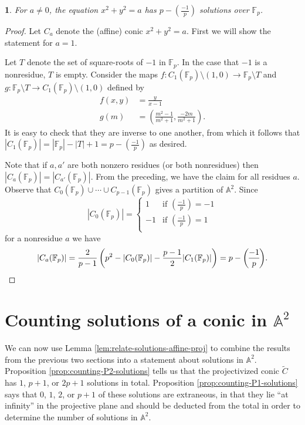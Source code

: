 \documentclass[10pt,a4paper]{amsart}
\numberwithin{equation}{section}
\numberwithin{figure}{section}
\numberwithin{table}{section}
\theoremstyle{definition}
\theoremstyle{plain}
\theoremstyle{remark}
\theoremstyle{plain}
\theoremstyle{definition}
\theoremstyle{plain}
\newtheorem{prop}[thm]{\protect\propositionname}
\theoremstyle{plain}
\providecommand{\propositionname}{Proposition}
\newcommand{\legendre}[2]{\genfrac{(}{)}{}{}{#1}{#2}}
\newcommand{\A}{\mathbb{A}}
\newcommand{\F}{\mathbb{F}}
\begin{document}
	\begin{prop}\label{prop:circle-solutions} 
		For $a \neq 0$, the equation $x^2 + y^2 = a$ has $p - \legendre{-1}{p}$ 
		solutions over $\F_p$.
	\end{prop} 
	\begin{proof} 
		Let $C_a$ denote the (affine) conic $x^2 + y^2 = a$. 
		First we will show the statement for $a=1$.
		
		Let $T$ denote the set of square-roots of $-1$ in $\F_p$. In the case
		that $-1$ is a nonresidue, $T$ is empty. Consider the maps $f\colon C_1(\F_p)
		\setminus (1,0) \to \F_p \setminus T$ and $g\colon \F_p
		\setminus T \to C_1(\F_p) \setminus (1,0)$ defined by 
		\begin{align*} 
		f(x,y) &= \frac{y}{x-1} \\ 
		g(m) &= \left(\frac{m^2 - 1}{m^2 + 1}, \frac{-2m}{m^2 + 1}\right).
		\end{align*} 
		It is easy to check that they are inverse to one
		another, from which it follows that $|C_1(\F_p)| = |\F_p| - |T| + 1 = p -
		\legendre{-1}{p}$ as desired.
		
		Note that if $a,a'$ are both nonzero residues (or both nonresidues)
		then $|C_a(\F_p)| = |C_{a'}(\F_p)|$. From the preceding, we have the claim for all residues
		$a$. Observe that $C_0(\F_p) \cup \cdots \cup C_{p-1}(\F_p)$ gives a partition of
		$\mathbb{A}^2$. Since 
		\[ |C_0(\F_p)| = \begin{cases}
		1 & \text{if } \legendre{-1}{p} = -1 \\
		-1 & \text{if } \legendre{-1}{p} = 1 \\
		\end{cases} \] 
		for a nonresidue $a$ we have 
		\[ |C_a(\F_p)| = \frac{2}{p-1} 
		\left(p^2 - |C_0(\F_p)| - \frac{p-1}{2}|C_1(\F_p)|\right) = 
		p - \legendre{-1}{p}. \qedhere \] 
	\end{proof}
	
	\section{Counting solutions of a conic in $\A^2$}
	\label{sec:affine-solutions}
	
	We can now use Lemma \ref{lem:relate-solutions-affine-proj} to combine the
	results from the previous two sections into a statement about solutions in $\A^2$. Proposition \ref{prop:counting-P2-solutions} tells us that the projectivized conic $\widetilde{C}$ has $1$, $p+1$, or $2p+1$ solutions in total. Proposition \ref{prop:counting-P1-solutions} says that $0$, $1$, $2$, or $p+1$ of these solutions are extraneous, in that they lie ``at infinity'' in the projective plane and should be deducted from the total in order to determine the number of solutions in $\A^2$.
	
\end{document}
